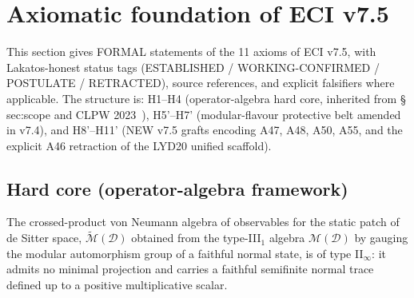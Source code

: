 
\section{Axiomatic foundation of ECI v7.5}
\label{sec:axioms-v75}

This section gives FORMAL statements of the 11 axioms of ECI v7.5, with
Lakatos-honest status tags (ESTABLISHED / WORKING-CONFIRMED / POSTULATE
/ RETRACTED), source references, and explicit falsifiers where
applicable.  The structure is: H1--H4 (operator-algebra hard core,
inherited from \cite{eci.tex} \S\,sec:scope and CLPW
2023~\cite{CLPW23}), H5'--H7' (modular-flavour protective belt amended
in v7.4), and H8'--H11' (NEW v7.5 grafts encoding A47, A48, A50, A55,
and the explicit A46 retraction of the LYD20 unified scaffold).

\subsection{Hard core (operator-algebra framework)}
\label{sec:axioms-hardcore}

\begin{axiom*}
The crossed-product von Neumann algebra of observables for the static
patch of de Sitter space, $\widetilde{\mathcal{M}}(\mathcal{D})$ obtained
from the type-III$_1$ algebra $\mathcal{M}(\mathcal{D})$ by gauging the
modular automorphism group of a faithful normal state, is of type
II$_\infty$: it admits no minimal projection and carries a faithful
semifinite normal trace defined up to a positive multiplicative scalar.
\end{axiom*}

